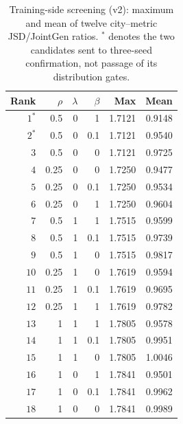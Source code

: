 \begin{table}[t]
\centering\footnotesize
\setlength{\tabcolsep}{4pt}
\caption{Training-side screening (v2): maximum and mean of twelve city--metric JSD/JointGen ratios. $^*$ denotes the two candidates sent to three-seed confirmation, not passage of its distribution gates.}
\label{tab:grid}
\begin{tabular}{rrrrrr}
\toprule
Rank & $\rho$ & $\lambda$ & $\beta$ & Max & Mean \\
\midrule
$1^{*}$ & 0.5 & 0 & 1 & 1.7121 & 0.9148 \\
$2^{*}$ & 0.5 & 0 & 0.1 & 1.7121 & 0.9540 \\
$3$ & 0.5 & 0 & 0 & 1.7121 & 0.9725 \\
$4$ & 0.25 & 0 & 0 & 1.7250 & 0.9477 \\
$5$ & 0.25 & 0 & 0.1 & 1.7250 & 0.9534 \\
$6$ & 0.25 & 0 & 1 & 1.7250 & 0.9604 \\
$7$ & 0.5 & 1 & 1 & 1.7515 & 0.9599 \\
$8$ & 0.5 & 1 & 0.1 & 1.7515 & 0.9739 \\
$9$ & 0.5 & 1 & 0 & 1.7515 & 0.9817 \\
$10$ & 0.25 & 1 & 0 & 1.7619 & 0.9594 \\
$11$ & 0.25 & 1 & 0.1 & 1.7619 & 0.9695 \\
$12$ & 0.25 & 1 & 1 & 1.7619 & 0.9782 \\
$13$ & 1 & 1 & 1 & 1.7805 & 0.9578 \\
$14$ & 1 & 1 & 0.1 & 1.7805 & 0.9951 \\
$15$ & 1 & 1 & 0 & 1.7805 & 1.0046 \\
$16$ & 1 & 0 & 1 & 1.7841 & 0.9501 \\
$17$ & 1 & 0 & 0.1 & 1.7841 & 0.9962 \\
$18$ & 1 & 0 & 0 & 1.7841 & 0.9989 \\
\bottomrule
\end{tabular}
\end{table}
